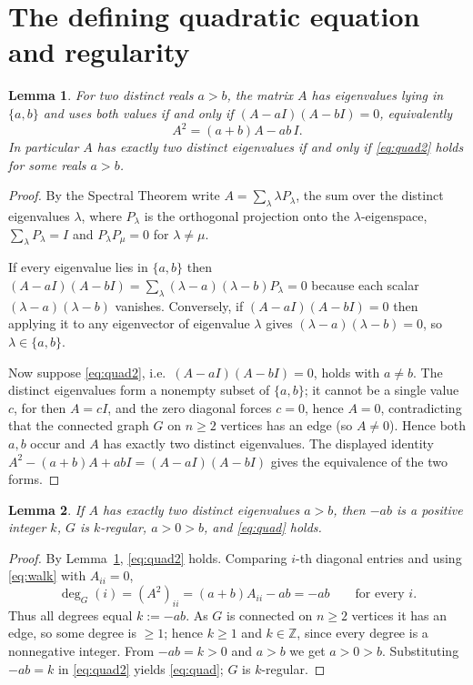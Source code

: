 \documentclass{amsart}
\newtheorem{lemma}{Lemma}
\theoremstyle{definition}
\begin{document}
\section{The defining quadratic equation and regularity}\label{sec:quad}

\begin{lemma}\label{lem:quad}
For two distinct reals $a>b$, the matrix $A$ has eigenvalues lying in
$\{a,b\}$ and uses both values if and only if $(A-aI)(A-bI)=0$, equivalently
\begin{equation}\label{eq:quad2}
A^2=(a+b)A-ab\,I .
\end{equation}
In particular $A$ has exactly two distinct eigenvalues if and only if
\eqref{eq:quad2} holds for some reals $a>b$.
\end{lemma}

\begin{proof}
By the Spectral Theorem write $A=\sum_{\lambda}\lambda P_\lambda$, the sum over
the distinct eigenvalues $\lambda$, where $P_\lambda$ is the orthogonal
projection onto the $\lambda$-eigenspace, $\sum_\lambda P_\lambda=I$ and
$P_\lambda P_\mu=0$ for $\lambda\ne\mu$.

If every eigenvalue lies in $\{a,b\}$ then
$(A-aI)(A-bI)=\sum_\lambda(\lambda-a)(\lambda-b)P_\lambda=0$ because each scalar
$(\lambda-a)(\lambda-b)$ vanishes. Conversely, if $(A-aI)(A-bI)=0$ then
applying it to any eigenvector of eigenvalue $\lambda$ gives
$(\lambda-a)(\lambda-b)=0$, so $\lambda\in\{a,b\}$.

Now suppose \eqref{eq:quad2}, i.e.\ $(A-aI)(A-bI)=0$, holds with $a\ne b$. The
distinct eigenvalues form a nonempty subset of $\{a,b\}$; it cannot be a single
value $c$, for then $A=cI$, and the zero diagonal forces $c=0$, hence $A=0$,
contradicting that the connected graph $G$ on $n\ge2$ vertices has an edge
(so $A\ne0$). Hence both $a,b$ occur and $A$ has exactly two distinct
eigenvalues. The displayed identity
$A^2-(a+b)A+abI=(A-aI)(A-bI)$ gives the equivalence of the two forms.
\end{proof}

\begin{lemma}\label{lem:regular}
If $A$ has exactly two distinct eigenvalues $a>b$, then $-ab$ is a positive
integer $k$, $G$ is $k$-regular, $a>0>b$, and \eqref{eq:quad} holds.
\end{lemma}

\begin{proof}
By Lemma~\ref{lem:quad}, \eqref{eq:quad2} holds. Comparing $i$-th diagonal
entries and using \eqref{eq:walk} with $A_{ii}=0$,
\[
\deg_G(i)=(A^2)_{ii}=(a+b)A_{ii}-ab=-ab\qquad\text{for every }i .
\]
Thus all degrees equal $k:=-ab$. As $G$ is connected on $n\ge2$ vertices it has
an edge, so some degree is $\ge1$; hence $k\ge1$ and $k\in\mathbb Z$, since
every degree is a nonnegative integer. From $-ab=k>0$ and $a>b$ we get
$a>0>b$. Substituting $-ab=k$ in \eqref{eq:quad2} yields \eqref{eq:quad}; $G$
is $k$-regular.
\end{proof}
\end{document}
